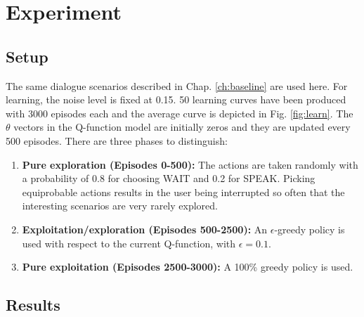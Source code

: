 \section{Experiment}
	
    \subsection{Setup}

		The same dialogue scenarios described in Chap. \ref{ch:baseline} are used here. For learning, the noise level is fixed at 0.15. 50 learning curves have been produced with 3000 episodes each and the average curve is depicted in Fig. \ref{fig:learn}. The $\theta$ vectors in the Q-function model are initially zeros and they are updated every 500 episodes. There are three phases to distinguish:
        
        \begin{enumerate}
        	\item \textbf{Pure exploration (Episodes 0-500):} The actions are taken randomly with a probability of 0.8 for choosing WAIT and 0.2 for SPEAK. Picking equiprobable actions results in the user being interrupted so often that the interesting scenarios are very rarely explored.
            \item \textbf{Exploitation/exploration (Episodes 500-2500):} An $\epsilon$-greedy policy is used with respect to the current Q-function, with $\epsilon=0.1$.
            \item \textbf{Pure exploitation (Episodes 2500-3000):} A 100\% greedy policy is used.
        \end{enumerate}
   
   	\subsection{Results}
    
